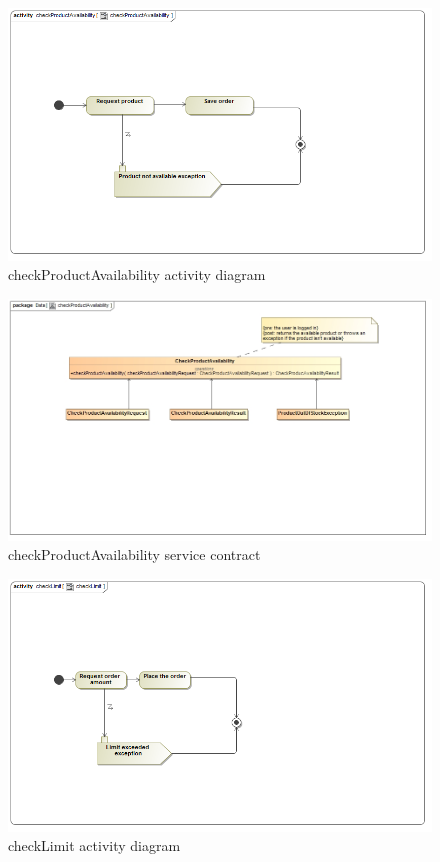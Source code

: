 \documentclass[a4paper,12pt]{article}
\begin{document}
\begin{figure}[H]
  \centering
    \includegraphics[width=1.0\textwidth]{images/checkProductAvailability.png}
    \caption{checkProductAvailability activity diagram} 
\end{figure}

\begin{figure}[H]
	\centering
	\includegraphics[width=1.0\textwidth]{images/checkProductAvailabilitySC.jpg}
	\caption{checkProductAvailability service contract}
\end{figure}

\begin{figure}[H]
  \centering
    \includegraphics[width=1.0\textwidth]{images/checkLimit.png}
    \caption{checkLimit activity diagram} 
\end{figure}
\end{document}
